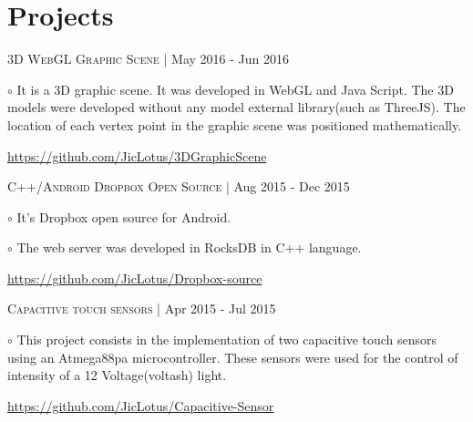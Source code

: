 \documentclass[letterpaper]{article}
\renewenvironment{itemize}{
  \begin{list}{}{
    \setlength{\leftmargin}{1.5em}
  }
}{
  \end{list}
}
\newenvironment{no-indent-itemize}{
  \begin{list}{}{
    \setlength{\leftmargin}{0em}
  }
}{
  \end{list}
}
\def\bullet{$\circ$\xspace}
\begin{document}
\section*{Projects}
\begin{no-indent-itemize}
    
    \item \textsc{3D WebGL Graphic Scene} | May 2016 - Jun 2016
    \begin{itemize}
    \item\bullet It is a 3D graphic scene. It was developed in WebGL and Java Script. The 3D models were developed without any model external library(such as ThreeJS). The location of each vertex point in the graphic scene was positioned mathematically.
    \end{itemize}
    \begin{itemize}
    \item \href{https://github.com/JicLotus/3DGraphicScene}{https://github.com/JicLotus/3DGraphicScene}
    
    \end{itemize}

    \item \textsc{C++/Android Dropbox Open Source} | Aug 2015 - Dec 2015
    \begin{itemize}
        \item\bullet It's Dropbox open source for Android.
        \item\bullet The web server was developed in RocksDB in C++ language.
        \end{itemize}    
    \begin{itemize}
        \item \href{https://github.com/JicLotus/Dropbox-source}{https://github.com/JicLotus/Dropbox-source}
    \end{itemize}

    \item \textsc{Capacitive touch sensors} |  Apr 2015 - Jul 2015

    \begin{itemize}
        \item\bullet This project consists in the implementation of two capacitive touch sensors using an Atmega88pa microcontroller. These sensors were used for the control of intensity of a 12 Voltage(voltash) light.
         
         \href{https://github.com/JicLotus/Capacitive-Sensor}{https://github.com/JicLotus/Capacitive-Sensor}
    \end{itemize}

\end{no-indent-itemize}
\end{document}
